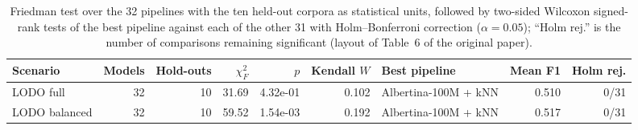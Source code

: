 \begin{table}[t]
\centering
\small
\caption{Friedman test over the 32 pipelines with the ten held-out corpora as statistical units, followed by two-sided Wilcoxon signed-rank tests of the best pipeline against each of the other 31 with Holm--Bonferroni correction ($\alpha=0.05$); ``Holm rej.'' is the number of comparisons remaining significant (layout of Table~6 of the original paper).}
\label{tab:lodo-stats}
\begin{tabular}{lrrrrrlrr}
\toprule
Scenario & Models & Hold-outs & $\chi^2_F$ & $p$ & Kendall $W$ & Best pipeline & Mean F1 & Holm rej. \\
\midrule
LODO full & 32 & 10 & 31.69 & 4.32e-01 & 0.102 & Albertina-100M + kNN & 0.510 & 0/31 \\
LODO balanced & 32 & 10 & 59.52 & 1.54e-03 & 0.192 & Albertina-100M + kNN & 0.517 & 0/31 \\
\bottomrule
\end{tabular}
\end{table}
